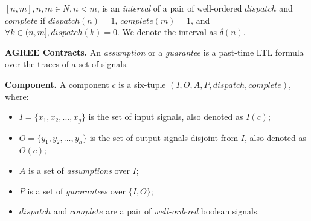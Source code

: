$[n, m], n,m \in N, n<m$, is an \emph{interval} of a pair of well-ordered $dispatch$ and $complet$e if $dispatch(n) = 1$, $complete(m) = 1$, and $\forall k\in (n, m], dispatch(k)=0$. We denote the interval as $\delta(n)$.

{\bf AGREE Contracts.}
An \emph{assumption} or a \emph{guarantee} is a past-time LTL formula over the traces of a set of signals.

{\bf Component.}
A component $c$ is a six-tuple $(I, O, A, P, dispatch, complete)$, where: 
\begin{itemize}
    	\item $I = \{x_1, x_2, ..., x_g\}$ is the set of input signals, also denoted as $I(c)$;
    	\item $O= \{y_1, y_2, ..., y_h\}$ is the set of output signals disjoint from $I$, also denoted as $O(c)$;
	\item $A$ is a set of \emph{assumptions} over $I$;
	\item $P$ is a set of \emph{gurarantees} over $\{I, O\}$;
    	\item $dispatch$ and $complete$ are a pair of \emph{well-ordered} boolean signals.
\end{itemize}
